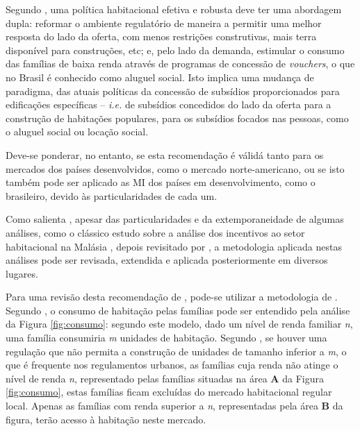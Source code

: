 \documentclass[
	12pt,				%
	oneside,			%
	a4paper,			%
	chapter=TITLE,		%
	section=TITLE,		%
	english,			%
	brazil				%
	]{abntex2}
\begin{document}
\begin{refsection}
Segundo \textcite{malpezzi_affordable_2018_1}, uma política habitacional efetiva e robusta
deve ter uma abordagem dupla: reformar o ambiente regulatório de maneira a
permitir uma melhor resposta do lado da oferta, com menos restrições
construtivas, mais terra disponível para construções, etc; e, pelo lado da
demanda, estimular o consumo das famílias de baixa renda através de programas de
concessão de \emph{vouchers}, o que no Brasil é conhecido como aluguel social. Isto
implica uma mudança de paradigma, das atuais políticas da concessão de subsídios
proporcionados para edificações específicas -- \emph{i.e.} de subsídios concedidos do
lado da oferta para a construção de habitações populares, para os subsídios
focados nas pessoas, como o aluguel social ou locação social.

Deve-se ponderar, no entanto, se esta recomendação é válidá tanto para os
mercados dos países desenvolvidos, como o mercado norte-americano, ou se isto
também pode ser aplicado as \gls{MI} dos países em desenvolvimento, como o
brasileiro, devido às particularidades de cada um.

Como salienta \textcite{malpezzi_affordable_2018_6}, apesar das particularidades e da
extemporaneidade de algumas análises, como o clássico estudo sobre a análise dos
incentivos ao setor habitacional na Malásia \autocite{malaysia}, depois revisitado
por \autocite{malpezzi_real_2017}, a metodologia aplicada nestas análises pode ser
revisada, extendida e aplicada posteriormente em diversos lugares.

Para uma revisão desta recomendação de \textcite{malpezzi_affordable_2018_1}, pode-se
utilizar a metodologia de \textcite{bertaud}. Segundo \textcite[p.~257]{bertaud}, o consumo de
habitação pelas famílias pode ser entendido pela análise da Figura
\ref{fig:consumo}: segundo este modelo, dado um nível de renda familiar \emph{n},
uma família consumiria \emph{m} unidades de habitação. Segundo \textcite[p.~257]{bertaud}, se
houver uma regulação que não permita a construção de unidades de tamanho
inferior a \emph{m}, o que é frequente nos regulamentos urbanos, as famílias cuja
renda não atinge o nível de renda \emph{n}, representado pelas famílias situadas na
área \textbf{A} da Figura \ref{fig:consumo}, estas famílias ficam excluídas do
mercado habitacional regular local. Apenas as famílias com renda superior a \emph{n},
representadas pela área \textbf{B} da figura, terão acesso à habitação neste mercado.


\end{refsection}
\end{document}
